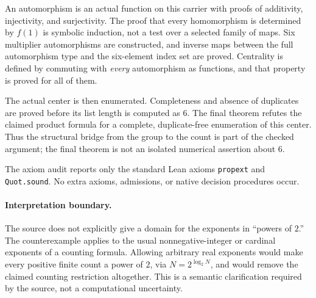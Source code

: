 \documentclass[10pt]{article}
\begin{document}
An automorphism is an actual function on this carrier with proofs of additivity, injectivity, and surjectivity. The proof that every homomorphism is determined by $f(1)$ is symbolic induction, not a test over a selected family of maps. Six multiplier automorphisms are constructed, and inverse maps between the full automorphism type and the six-element index set are proved. Centrality is defined by commuting with \emph{every} automorphism as functions, and that property is proved for all of them.

The actual center is then enumerated. Completeness and absence of duplicates are proved before its list length is computed as $6$. The final theorem refutes the claimed product formula for a complete, duplicate-free enumeration of this center. Thus the structural bridge from the group to the count is part of the checked argument; the final theorem is not an isolated numerical assertion about $6$.

The axiom audit reports only the standard Lean axioms \texttt{propext} and \texttt{Quot.sound}. No extra axioms, admissions, or native decision procedures occur.

\paragraph{Interpretation boundary.}
The source does not explicitly give a domain for the exponents in ``powers of $2$.'' The counterexample applies to the usual nonnegative-integer or cardinal exponents of a counting formula. Allowing arbitrary real exponents would make every positive finite count a power of $2$, via $N=2^{\log_2 N}$, and would remove the claimed counting restriction altogether. This is a semantic clarification required by the source, not a computational uncertainty.
\end{document}
